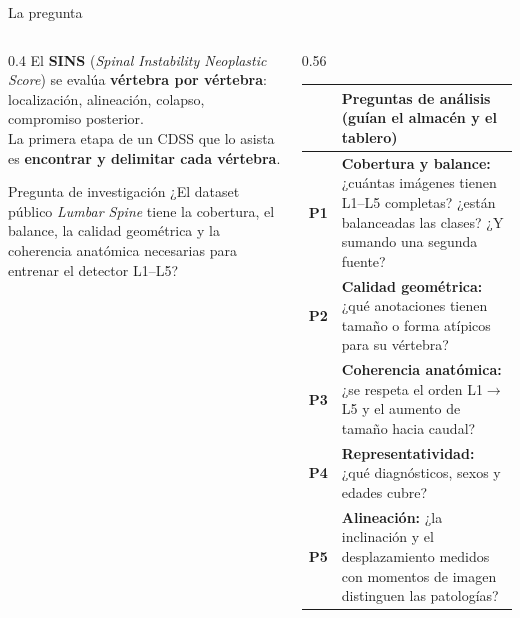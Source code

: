\documentclass[aspectratio=169,10pt]{beamer}
\begin{document}
\begin{frame}{La pregunta}
  \begin{columns}[T]
    \begin{column}{0.4\textwidth}
      \small
      El \textbf{SINS} (\emph{Spinal Instability Neoplastic Score}) se evalúa \textbf{vértebra por vértebra}: localización, alineación, colapso, compromiso posterior.\\[1ex]
      La primera etapa de un CDSS que lo asista es \textbf{encontrar y delimitar cada vértebra}.\\[1.5ex]
      \begin{block}{Pregunta de investigación}
        \footnotesize ¿El dataset público \emph{Lumbar Spine} tiene la cobertura, el balance, la calidad geométrica y la coherencia anatómica necesarias para entrenar el detector L1–L5?
      \end{block}
    \end{column}
    \begin{column}{0.56\textwidth}
      \footnotesize
      \renewcommand{\arraystretch}{1.35}
      \begin{tabularx}{\linewidth}{@{}lX@{}}
        \toprule
        & \textbf{Preguntas de análisis} (guían el almacén y el tablero) \\
        \midrule
        \textbf{\color{itba}P1} & \textbf{Cobertura y balance:} ¿cuántas imágenes tienen L1–L5 completas? ¿están balanceadas las clases? ¿Y sumando una segunda fuente? \\
        \textbf{\color{itba}P2} & \textbf{Calidad geométrica:} ¿qué anotaciones tienen tamaño o forma atípicos para su vértebra? \\
        \textbf{\color{itba}P3} & \textbf{Coherencia anatómica:} ¿se respeta el orden L1$\rightarrow$L5 y el aumento de tamaño hacia caudal? \\
        \textbf{\color{itba}P4} & \textbf{Representatividad:} ¿qué diagnósticos, sexos y edades cubre? \\
        \textbf{\color{itba}P5} & \textbf{Alineación:} ¿la inclinación y el desplazamiento medidos con momentos de imagen distinguen las patologías? \\
        \bottomrule
      \end{tabularx}
    \end{column}
  \end{columns}
\end{frame}
\end{document}
